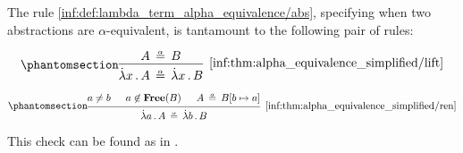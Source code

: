 \begin{proposition}\label{thm:alpha_equivalence_simplified}
  The rule \ref{inf:def:lambda_term_alpha_equivalence/abs}, specifying when two abstractions are \( \alpha \)-equivalent, is tantamount to the following pair of rules:
  \begin{paracol}{2}
    \begin{leftcolumn}
      \ParacolAlignmentHack
      \begin{equation*}\taglabel[\ensuremath{ \logic{Lift}_\alpha }]{inf:thm:alpha_equivalence_simplified/lift}
        \begin{prooftree}
          \hypo{ A \aequiv B }
          \infer1[\ref{inf:thm:alpha_equivalence_simplified/lift}]{ \qabs x A \aequiv \qabs x B }
        \end{prooftree}
      \end{equation*}
    \end{leftcolumn}

    \begin{rightcolumn}
      \ParacolAlignmentHack
      \begin{equation*}\taglabel[\ensuremath{ \logic{Ren}_\alpha }]{inf:thm:alpha_equivalence_simplified/ren}
        \begin{prooftree}
          \hypo{ a \neq b }
          \hypo{ a \not\in \op*{Free}(B) }
          \hypo{ A \aequiv B[b \mapsto a] }
          \infer3[\ref{inf:thm:alpha_equivalence_simplified/ren}]{ \qabs a A \aequiv \qabs b B }
        \end{prooftree}
      \end{equation*}
    \end{rightcolumn}
  \end{paracol}
\end{proposition}
\begin{comments}
  \item This check can be found as  in \cite{notebook:code}.
\end{comments}
